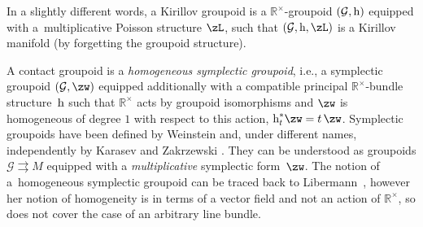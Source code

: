 \documentclass[10pt,a4paper]{amsart}
\newcommand{\rmh}{\textnormal{h}}
\newcommand{\R}{{\mathbb R}}
\newcommand{\ti}{\times}
\def\Rt{{\R^\times}}
\def\cG{\mathcal{G}}
\numberwithin{equation}{section}
\begin{document}
In a slightly dif\/ferent words, a Kirillov groupoid is a $\mathbb{R}^{\times}$-groupoid $(\mathcal{G}, \rmh)$ equipped with a~multiplicative Poisson structure $\zL$, such that $(\mathcal{G}, \rmh , \zL)$ is a Kirillov manifold (by forgetting the groupoid structure).

\begin{Remark} A contact groupoid is a \emph{homogeneous symplectic groupoid}, i.e., a symplectic groupoid $(\cG,\zw)$ equipped additionally with a compatible principal $\Rt$-bundle structure~$\rmh$ such that $\Rt$ acts by groupoid isomorphisms and $\zw$ is homogeneous of degree $1$ with respect to this action, $\rmh_t^*\zw=t\,\zw$. Symplectic groupoids have been def\/ined by Weinstein \cite{Weinstein:1987} and, under dif\/ferent names, independently by Karasev \cite{Karasev:1987} and Zakrzewski \cite{Zakrzewski:1990,Zakrzewski:1990a}. They can be understood as groupoids $\cG\rightrightarrows M$ equipped with a \emph{multiplicative} symplectic form~$\zw$. The notion of a~homogeneous symplectic groupoid can be traced back to Libermann~\cite{Libermann:1995}, however her notion of homogeneity is in terms of a vector f\/ield and not an action of $\R^\ti$, so does not cover the case of an arbitrary line bundle.
\end{Remark}
\end{document}
